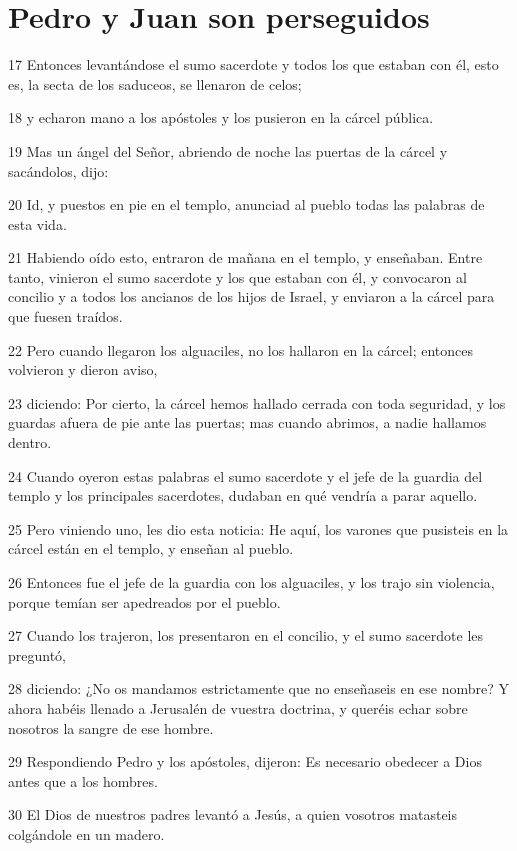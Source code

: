 \section*{Pedro y Juan son perseguidos}

\par 17 Entonces levantándose el sumo sacerdote y todos los que estaban con él, esto es, la secta de los saduceos, se llenaron de celos;
\par 18 y echaron mano a los apóstoles y los pusieron en la cárcel pública.
\par 19 Mas un ángel del Señor, abriendo de noche las puertas de la cárcel y sacándolos, dijo:
\par 20 Id, y puestos en pie en el templo, anunciad al pueblo todas las palabras de esta vida.
\par 21 Habiendo oído esto, entraron de mañana en el templo, y enseñaban. Entre tanto, vinieron el sumo sacerdote y los que estaban con él, y convocaron al concilio y a todos los ancianos de los hijos de Israel, y enviaron a la cárcel para que fuesen traídos.
\par 22 Pero cuando llegaron los alguaciles, no los hallaron en la cárcel; entonces volvieron y dieron aviso,
\par 23 diciendo: Por cierto, la cárcel hemos hallado cerrada con toda seguridad, y los guardas afuera de pie ante las puertas; mas cuando abrimos, a nadie hallamos dentro.
\par 24 Cuando oyeron estas palabras el sumo sacerdote y el jefe de la guardia del templo y los principales sacerdotes, dudaban en qué vendría a parar aquello.
\par 25 Pero viniendo uno, les dio esta noticia: He aquí, los varones que pusisteis en la cárcel están en el templo, y enseñan al pueblo.
\par 26 Entonces fue el jefe de la guardia con los alguaciles, y los trajo sin violencia, porque temían ser apedreados por el pueblo.
\par 27 Cuando los trajeron, los presentaron en el concilio, y el sumo sacerdote les preguntó,
\par 28 diciendo: ¿No os mandamos estrictamente que no enseñaseis en ese nombre? Y ahora habéis llenado a Jerusalén de vuestra doctrina, y queréis echar sobre nosotros la sangre de ese hombre.
\par 29 Respondiendo Pedro y los apóstoles, dijeron: Es necesario obedecer a Dios antes que a los hombres.
\par 30 El Dios de nuestros padres levantó a Jesús, a quien vosotros matasteis colgándole en un madero.
